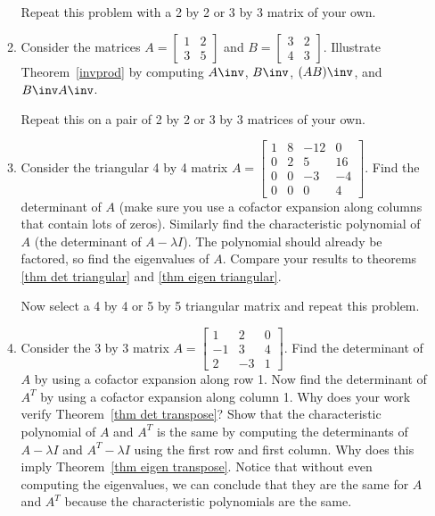 \begin{enumerate}
\begin{enumerate}
  Repeat this problem with a 2 by 2 or 3 by 3 matrix of your own.
  
  
  \item Consider the matrices 
    $A=\begin{bmatrix}
	1 & 2 \\
	3 & 5
	\end{bmatrix}$ and 
	  $B=\begin{bmatrix}
	3 & 2 \\
	4 & 3
	\end{bmatrix}$.
	Illustrate Theorem~\ref{invprod} by computing $A\inv$, $B\inv$, $(AB)\inv$, and $B\inv A\inv$. 
  
  Repeat this on a pair of 2 by 2 or 3 by 3 matrices of your own.

  \item  Consider the triangular 4 by 4 matrix 
  $A=\begin{bmatrix}
	1 & 8 & -12& 0 \\
	0 & 2 & 5& 16 \\
	0 & 0 & -3& -4 \\
	0 & 0 & 0& 4
	\end{bmatrix}$.  
	Find the determinant of $A$ (make sure you use a cofactor expansion along columns that contain lots of zeros). Similarly find the characteristic polynomial of $A$ (the determinant of $A-\lambda I$). The polynomial should already be factored, so find the eigenvalues of $A$. Compare your results to theorems \ref{thm det triangular} and \ref{thm eigen triangular}.
	
	Now select a 4 by 4 or 5 by 5 triangular matrix and repeat this problem.
  
  \item Consider the 3 by 3 matrix 
  $A = 
\begin{bmatrix}
1&2&0\\
-1&3&4\\
2&-3&1
\end{bmatrix}
$. 
  Find the determinant of $A$ by using a cofactor expansion along row 1. 
  Now find the determinant of $A^T$ by using a cofactor expansion along column 1. Why does your work verify  Theorem~\ref{thm det transpose}? 
  Show that the characteristic polynomial of $A$ and $A^T$ is the same by computing the determinants of $A-\lambda I$ and $A^T-\lambda I$ using the first row and first column.
  Why does this imply Theorem~\ref{thm eigen transpose}. Notice that without even computing the eigenvalues, we can conclude that they are the same for $A$ and $A^T$ because the characteristic polynomials are the same.


\end{enumerate}
\end{enumerate}
